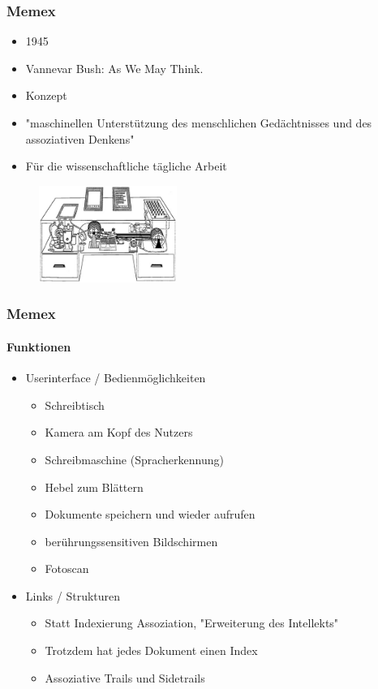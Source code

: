 \begin{frame}
\frametitle{Memex}
	\begin{itemize}
		\item 1945
		\item Vannevar Bush: As We May Think.
		\item Konzept
		\item "maschinellen Unterstützung des menschlichen Gedächtnisses und des assoziativen Denkens"
		\item Für die wissenschaftliche tägliche Arbeit
	\end{itemize}
	
	\begin{figure}[htbp]
		\centering
		\includegraphics[width=0.4\textwidth]{images/memex}
	\end{figure}

\end{frame}

\begin{frame}
	\frametitle{Memex}
	\framesubtitle{Funktionen}
	\begin{itemize}
		\item Userinterface / Bedienmöglichkeiten
		\begin{itemize}
			\item Schreibtisch
			\item Kamera am Kopf des Nutzers 
			\item Schreibmaschine (Spracherkennung)
			\item Hebel zum Blättern
			\item Dokumente speichern und wieder aufrufen
			\item berührungssensitiven Bildschirmen 
			\item Fotoscan
		\end{itemize}
		\item Links / Strukturen
		\begin{itemize}
			\item Statt Indexierung Assoziation, "Erweiterung des Intellekts"
			\item Trotzdem hat jedes Dokument einen Index
			\item Assoziative Trails und Sidetrails
		\end{itemize}
	\end{itemize}
\end{frame}
